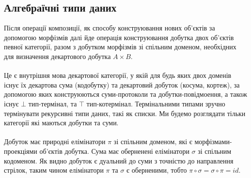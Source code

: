 \documentclass[9pt]{memoir}
\begin{document}
\newpage
\subsection{Алгебраїчні типи даних}

    Після операції композиції, як способу конструювання нових об’єктів
    за допомогою морфізмів далі йде операція конструювання добутка двох об’єктів певної категорії,
    разом з добутком морфізмів зі спільним доменом, необхідних для визначення декартового добутка $A \times B$.

    \paragraph{}
    Це є внутрішня мова декартової категорії, у якій для будь яких двох доменів існує їх декартова сума (кодобутку)
    та декартовий добуток (косума, кортеж), за допомогою яких конструюються суми-протоколи та добутки-повідмоення,
    а також існує $\bot$ тип-термінал, та $\top$ тип-котермінал. Термінальними типами зручно термінувати рекурсивні
    типи даних, такі як списки. Ми будемо розглядати тільки категорії які маються добутки та суми.

    \paragraph{}
    Добуток має природні елімінатори $\pi$ зі спільним доменом, які є морфізмами-проекціями об’єктів добутка. Сума має оберненені
    елімінатори $\sigma$ зі спільним кодоменом. Як видно добуток є дуальний до суми з точністю до направлення стрілок,
    таким чином елімінатори $\pi$ та $\sigma$ є оберненими, тобто $\pi \circ \sigma = \sigma \circ \pi = id$.
\end{document}
